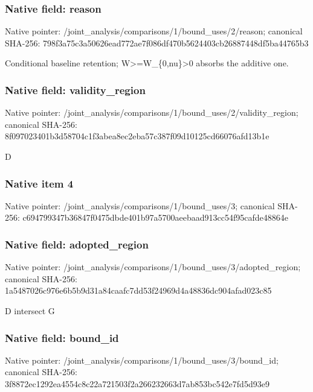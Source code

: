\documentclass[10pt,a4paper]{article}
\begin{document}
\subsubsection{Native field: reason}
Native pointer: /joint\_\allowbreak{}analysis/comparisons/1/bound\_\allowbreak{}uses/2/reason; canonical SHA-256: 798f3a75c3a50626ead772ae7f086df470b5624403cb26887448df5ba44765b3

\begingroup\raggedright\sloppy Conditional baseline retention;\allowbreak{} W>=\allowbreak{}W\_\allowbreak{}\{0,\allowbreak{}nu\}>0 absorbs the additive one.\par\endgroup

\subsubsection{Native field: validity\_\allowbreak{}region}
Native pointer: /joint\_\allowbreak{}analysis/comparisons/1/bound\_\allowbreak{}uses/2/validity\_\allowbreak{}region; canonical SHA-256: 8f097023401b3d58704c1f3abea8ec2eba57c387f09d10125cd66076afd13b1e

\begingroup\raggedright\sloppy D\par\endgroup

\subsubsection{Native item 4}
Native pointer: /joint\_\allowbreak{}analysis/comparisons/1/bound\_\allowbreak{}uses/3; canonical SHA-256: c694799347b36847f0475dbde401b97a5700aeebaad913cc54f95cafde48864e

\subsubsection{Native field: adopted\_\allowbreak{}region}
Native pointer: /joint\_\allowbreak{}analysis/comparisons/1/bound\_\allowbreak{}uses/3/adopted\_\allowbreak{}region; canonical SHA-256: 1a5487026c976e6b5b9d31a84caafc7dd53f24969d4a48836dc904afad023c85

\begingroup\raggedright\sloppy D intersect G\par\endgroup

\subsubsection{Native field: bound\_\allowbreak{}id}
Native pointer: /joint\_\allowbreak{}analysis/comparisons/1/bound\_\allowbreak{}uses/3/bound\_\allowbreak{}id; canonical SHA-256: 3f8872ec1292ea4554c8c22a721503f2a266232663d7ab853bc542e7fd5d93e9
\end{document}
